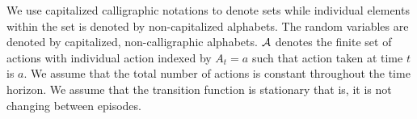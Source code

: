 We use capitalized calligraphic notations to denote sets while individual elements within the set is denoted by non-capitalized alphabets. The random variables are denoted by capitalized, non-calligraphic alphabets. $\mathcal{A}$ denotes the finite set of actions  with individual action indexed by $A_t = a$ such that action taken at time $t$ is $a$. We assume that the total number of actions is constant throughout the time horizon. We assume that the transition function is stationary that is, it is not changing between episodes.


